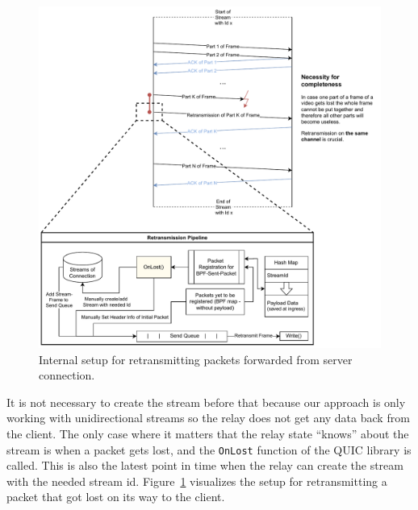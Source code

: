 \begin{figure}[H]
    \centering
    \includegraphics[width=\textwidth]{figures/03_fast_relays/retransmission.drawio.pdf}
    \caption[Packet retransmission schematic]{Internal setup for retransmitting packets forwarded from server connection.}\label{fig:packet-retransmission}
\end{figure}

\noindent
It is not necessary to create the stream before that because our approach is only working with 
unidirectional streams so the relay does not get any data back from the client.
The only case where it matters that the relay state ``knows'' about the stream is when a packet
gets lost, and the \verb|OnLost| function of the QUIC library is called.
This is also the latest point in time when the relay can create the stream with the needed stream id.
Figure~\ref{fig:packet-retransmission} visualizes the setup for retransmitting a packet that 
got lost on its way to the client. 